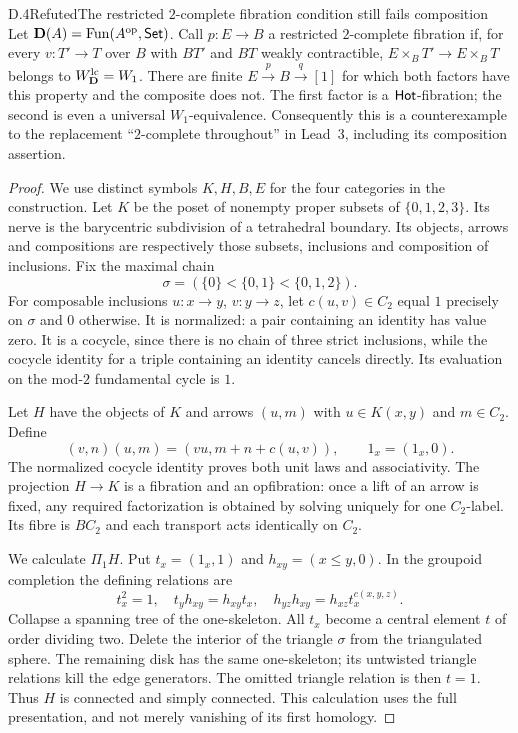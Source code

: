 \begin{claim}{D.4}{Refuted}{The restricted $2$-complete fibration condition still fails composition}
Let $\mathbf D(A)=\operatorname{Fun}(A^{\mathrm{op}},\mathsf{Set})$. Call $p:E\to B$ a restricted $2$-complete fibration if, for every $v:T'\to T$ over $B$ with $BT'$ and $BT$ weakly contractible, $E\times_BT'\to E\times_BT$ belongs to $W^{\mathrm{lc}}_{\mathbf D}=W_1$. There are finite $E\xrightarrow{p}B\xrightarrow{q}[1]$ for which both factors have this property and the composite does not. The first factor is a $\mathsf{Hot}$-fibration; the second is even a universal $W_1$-equivalence. Consequently this is a counterexample to the replacement ``$2$-complete throughout'' in Lead~3, including its composition assertion.
\end{claim}
\begin{proof}
We use distinct symbols $K,H,B,E$ for the four categories in the construction. Let $K$ be the poset of nonempty proper subsets of $\{0,1,2,3\}$. Its nerve is the barycentric subdivision of a tetrahedral boundary. Its objects, arrows and compositions are respectively those subsets, inclusions and composition of inclusions. Fix the maximal chain
\[
 \sigma=(\{0\}<\{0,1\}<\{0,1,2\}).
\]
For composable inclusions $u:x\to y$, $v:y\to z$, let $c(u,v)\in C_2$ equal $1$ precisely on $\sigma$ and $0$ otherwise. It is normalized: a pair containing an identity has value zero. It is a cocycle, since there is no chain of three strict inclusions, while the cocycle identity for a triple containing an identity cancels directly. Its evaluation on the mod-$2$ fundamental cycle is $1$.

Let $H$ have the objects of $K$ and arrows $(u,m)$ with $u\in K(x,y)$ and $m\in C_2$. Define
\[
 (v,n)(u,m)=(vu,m+n+c(u,v)),\qquad 1_x=(1_x,0).
\]
The normalized cocycle identity proves both unit laws and associativity. The projection $H\to K$ is a fibration and an opfibration: once a lift of an arrow is fixed, any required factorization is obtained by solving uniquely for one $C_2$-label. Its fibre is $BC_2$ and each transport acts identically on $C_2$.

We calculate $\Pi_1H$. Put $t_x=(1_x,1)$ and $h_{xy}=(x\leq y,0)$. In the groupoid completion the defining relations are
\[
 t_x^2=1,\quad t_yh_{xy}=h_{xy}t_x,\quad
 h_{yz}h_{xy}=h_{xz}t_x^{c(x,y,z)}.
\]
Collapse a spanning tree of the one-skeleton. All $t_x$ become a central element $t$ of order dividing two. Delete the interior of the triangle $\sigma$ from the triangulated sphere. The remaining disk has the same one-skeleton; its untwisted triangle relations kill the edge generators. The omitted triangle relation is then $t=1$. Thus $H$ is connected and simply connected. This calculation uses the full presentation, and not merely vanishing of its first homology.


\end{proof}
